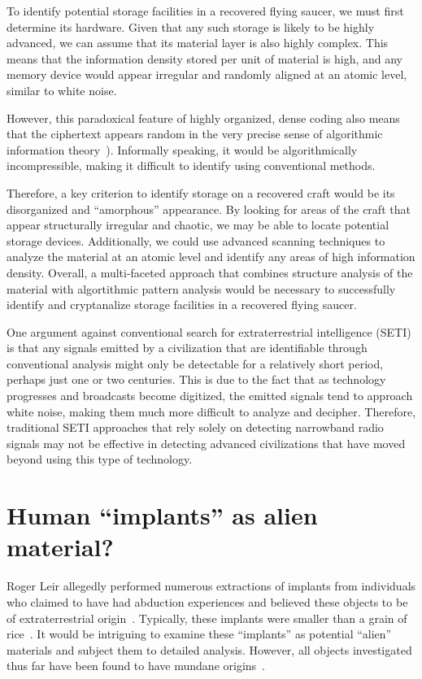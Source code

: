 To identify potential storage facilities in a recovered flying saucer, we must first determine its hardware.
Given that any such storage is likely to be highly advanced, we can assume that its material layer is also highly complex.
This means that the information density stored per unit of material is high, and any memory device would appear irregular and randomly aligned at an atomic level,
similar to white noise.

However, this paradoxical feature of highly organized, dense coding also means that the ciphertext appears random in the very precise sense
of algorithmic information theory~\cite{calude:02}). Informally speaking, it would be algorithmically incompressible, making it difficult to identify
using conventional methods.

Therefore, a key criterion to identify storage on a recovered craft would be its disorganized and ``amorphous'' appearance.
By looking for areas of the craft that appear structurally irregular and chaotic, we may be able to locate potential storage devices.
Additionally, we could use advanced scanning techniques to analyze the material at an atomic level and identify any areas of high information density.
Overall, a multi-faceted approach
that combines structure analysis of the material with algortithmic pattern analysis
would be necessary to successfully identify and cryptanalize storage facilities in a recovered flying saucer.

One argument against conventional search for extraterrestrial intelligence (SETI) is that any signals emitted by a civilization that are identifiable through conventional analysis might only be detectable for a relatively short period, perhaps just one or two centuries. This is due to the fact that as technology progresses and broadcasts become digitized, the emitted signals tend to approach white noise, making them much more difficult to analyze and decipher. Therefore, traditional SETI approaches that rely solely on detecting narrowband radio signals may
not be effective in detecting advanced civilizations that have moved beyond using this type of technology.

\section{Human ``implants'' as alien material?}


Roger Leir allegedly performed numerous extractions of implants from individuals who claimed to have had abduction experiences and believed these objects to be of extraterrestrial origin~\cite{Leir2000}. Typically, these implants were smaller than a grain of rice~\cite{DolanDisclosure2018Sep}. It would be intriguing to examine these ``implants'' as potential ``alien'' materials and subject them to detailed analysis. However, all objects investigated thus far have been found to have mundane origins~\cite{ScottLittle-implant}.



